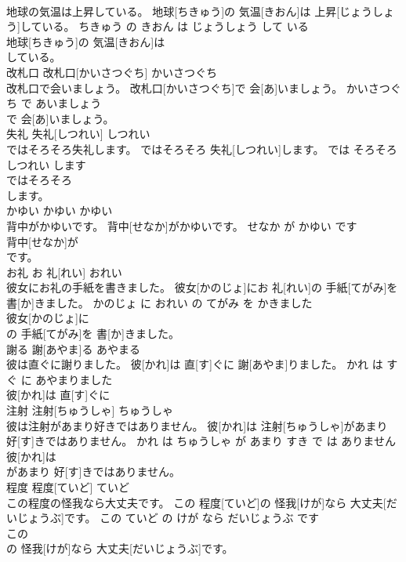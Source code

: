 \documentclass[8pt]{extreport}
\begin{document}
\begin{CJK}{UTF8}{min}
\\	地球の気温は上昇している。	地球[ちきゅう]の 気温[きおん]は 上昇[じょうしょう]している。	ちきゅう の きおん は じょうしょう して いる	
\\	地球[ちきゅう]の 気温[きおん]は
\\	している。		
\\	改札口	改札口[かいさつぐち]	かいさつぐち	
\\	改札口で会いましょう。	改札口[かいさつぐち]で 会[あ]いましょう。	かいさつぐち で あいましょう	
\\	で 会[あ]いましょう。		
\\	失礼	失礼[しつれい]	しつれい	
\\	ではそろそろ失礼します。	ではそろそろ 失礼[しつれい]します。	では そろそろ しつれい します	
\\	ではそろそろ
\\	します。		
\\	かゆい	かゆい	かゆい	
\\	背中がかゆいです。	背中[せなか]がかゆいです。	せなか が かゆい です	
\\	背中[せなか]が
\\	です。		
\\	お礼	お 礼[れい]	おれい	
\\	彼女にお礼の手紙を書きました。	彼女[かのじょ]にお 礼[れい]の 手紙[てがみ]を 書[か]きました。	かのじょ に おれい の てがみ を かきました	
\\	彼女[かのじょ]に
\\	の 手紙[てがみ]を 書[か]きました。		
\\	謝る	謝[あやま]る	あやまる	
\\	彼は直ぐに謝りました。	彼[かれ]は 直[す]ぐに 謝[あやま]りました。	かれ は すぐ に あやまりました	
\\	彼[かれ]は 直[す]ぐに
\\	注射	注射[ちゅうしゃ]	ちゅうしゃ	
\\	彼は注射があまり好きではありません。	彼[かれ]は 注射[ちゅうしゃ]があまり 好[す]きではありません。	かれ は ちゅうしゃ が あまり すき で は ありません	
\\	彼[かれ]は
\\	があまり 好[す]きではありません。		
\\	程度	程度[ていど]	ていど	
\\	この程度の怪我なら大丈夫です。	この 程度[ていど]の 怪我[けが]なら 大丈夫[だいじょうぶ]です。	この ていど の けが なら だいじょうぶ です	
\\	この
\\	の 怪我[けが]なら 大丈夫[だいじょうぶ]です。		

\end{CJK}
\end{document}
